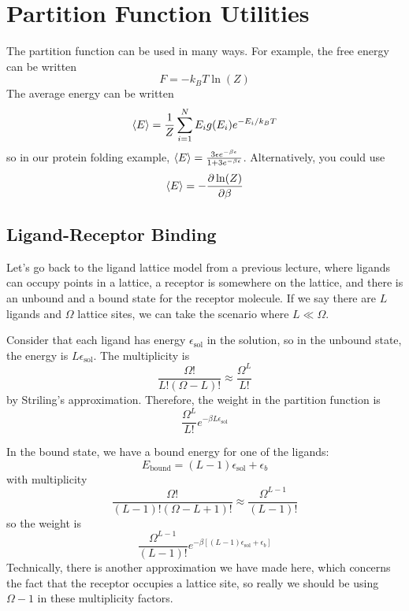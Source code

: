 \documentclass[a4paper,twoside,master.tex]{subfiles}
\begin{document}
\section{Partition Function Utilities}\label{sec:partition_function_utilities}

The partition function can be used in many ways. For example, the free energy can be written
\begin{equation}
    F = - k_B T \ln(Z)
\end{equation}
The average energy can be written
\begin{equation}
    \ev{E} = \frac{1}{Z} \sum_{i=1}^{N} E_i g(E_i) e^{- E_i / k_BT}
\end{equation}
so in our protein folding example, $ \ev{E} = \frac{3 \epsilon e^{- \beta \epsilon}}{1 + 3 e^{- \beta \epsilon}} $. Alternatively, you could use
\begin{equation}
    \ev{E} = -\pdv{\ln(Z)}{\beta}
\end{equation}

\subsection{Ligand-Receptor Binding}\label{sub:ligand-receptor_binding}

Let's go back to the ligand lattice model from a previous lecture, where ligands can occupy points in a lattice, a receptor is somewhere on the lattice, and there is an unbound and a bound state for the receptor molecule. If we say there are $ L $ ligands and $ \Omega $ lattice sites, we can take the scenario where $ L \ll \Omega $.

Consider that each ligand has energy $ \epsilon_{\text{sol}} $ in the solution, so in the unbound state, the energy is $ L \epsilon_{\text{sol}} $. The multiplicity is
\begin{equation}
    \frac{\Omega!}{L!(\Omega - L)!} \approx \frac{\Omega^L}{L!}
\end{equation}
by Striling's approximation. Therefore, the weight in the partition function is
\begin{equation}
    \frac{\Omega^L}{L!} e^{- \beta L \epsilon_{\text{sol}}}
\end{equation}

In the bound state, we have a bound energy for one of the ligands:
\begin{equation}
    E_{\text{bound}} = (L-1) \epsilon_{\text{sol}} + \epsilon_b
\end{equation}
with multiplicity
\begin{equation}
    \frac{\Omega!}{(L-1)!(\Omega - L + 1)!} \approx \frac{\Omega^{L-1}}{(L-1)!}
\end{equation}
so the weight is
\begin{equation}
    \frac{\Omega^{L-1}}{(L-1)!} e^{- \beta \left[ (L-1) \epsilon_{\text{sol}} + \epsilon_b \right]}
\end{equation}
Technically, there is another approximation we have made here, which concerns the fact that the receptor occupies a lattice site, so really we should be using $ \Omega - 1 $ in these multiplicity factors.
\end{document}
